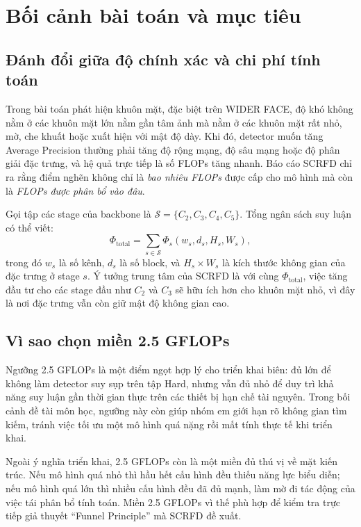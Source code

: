 
\chapter{Bối cảnh bài toán và mục tiêu}

\section{Đánh đổi giữa độ chính xác và chi phí tính toán}

Trong bài toán phát hiện khuôn mặt, đặc biệt trên WIDER FACE, độ khó không nằm ở các khuôn mặt lớn nằm gần tâm ảnh mà nằm ở các khuôn mặt rất nhỏ, mờ, che khuất hoặc xuất hiện với mật độ dày. Khi đó, detector muốn tăng Average Precision thường phải tăng độ rộng mạng, độ sâu mạng hoặc độ phân giải đặc trưng, và hệ quả trực tiếp là số FLOPs tăng nhanh. Báo cáo SCRFD chỉ ra rằng điểm nghẽn không chỉ là \textit{bao nhiêu FLOPs} được cấp cho mô hình mà còn là \textit{FLOPs được phân bổ vào đâu}. \cite{guo2022scrfd}

Gọi tập các stage của backbone là \(\mathcal{S} = \{C_2, C_3, C_4, C_5\}\). Tổng ngân sách suy luận có thể viết:
\[
\Phi_{\text{total}} = \sum_{s \in \mathcal{S}} \Phi_s(w_s, d_s, H_s, W_s),
\]
trong đó \(w_s\) là số kênh, \(d_s\) là số block, và \(H_s \times W_s\) là kích thước không gian của đặc trưng ở stage \(s\). Ý tưởng trung tâm của SCRFD là với cùng \(\Phi_{\text{total}}\), việc tăng đầu tư cho các stage đầu như \(C_2\) và \(C_3\) sẽ hữu ích hơn cho khuôn mặt nhỏ, vì đây là nơi đặc trưng vẫn còn giữ mật độ không gian cao. \cite{guo2022scrfd}

\section{Vì sao chọn miền 2.5 GFLOPs}

Ngưỡng 2.5 GFLOPs là một điểm ngọt hợp lý cho triển khai biên: đủ lớn để không làm detector suy sụp trên tập Hard, nhưng vẫn đủ nhỏ để duy trì khả năng suy luận gần thời gian thực trên các thiết bị hạn chế tài nguyên. Trong bối cảnh đề tài môn học, ngưỡng này còn giúp nhóm em giới hạn rõ không gian tìm kiếm, tránh việc tối ưu một mô hình quá nặng rồi mất tính thực tế khi triển khai.

Ngoài ý nghĩa triển khai, 2.5 GFLOPs còn là một miền đủ thú vị về mặt kiến trúc. Nếu mô hình quá nhỏ thì hầu hết cấu hình đều thiếu năng lực biểu diễn; nếu mô hình quá lớn thì nhiều cấu hình đều đã đủ mạnh, làm mờ đi tác động của việc tái phân bổ tính toán. Miền 2.5 GFLOPs vì thế phù hợp để kiểm tra trực tiếp giả thuyết ``Funnel Principle'' mà SCRFD đề xuất.

